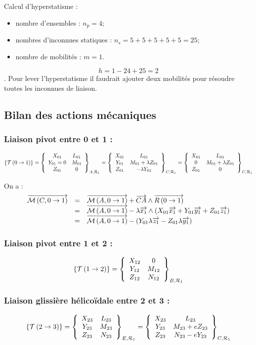 \documentclass[10pt,fleqn]{article} %
\begin{document}
Calcul d'hyperstatisme : 
\begin{itemize}
\item nombre d'ensembles : $n_p=4$;
\item nombres d'inconnues statiques : $n_s = 5+5+5+5+5 = 25$;
\item nombre de mobilités : $m=1$. 
\end{itemize}
$$h = 1-24+25=2$$. Pour lever l'hyperstatisme il faudrait ajouter deux mobilités pour résoudre toutes les inconnues de liaison. 
\subsection{Bilan des actions mécaniques}

\subsubsection*{Liaison pivot entre 0 et 1 :}
$$
\torseurstat{T}{0}{1}
=\torseurcol{X_{01}}{Y_{01}=0}{Z_{01}}{L_{01}}{M_{01}}{0}{A,\mathcal{R}_1}
=\torseurcol{X_{01}}{Y_{01}}{Z_{01}}{L_{01}}{M_{01}+\lambda Z_{01}}{-\lambda Y_{01}}{C,\mathcal{R}_1}
=\torseurcol{X_{01}}{0}{Z_{01}}{L_{01}}{M_{01}+\lambda Z_{01}}{0}{C,\mathcal{R}_1}
$$


On a :
$$
\begin{array}{lcl}
\vectm{C}{0}{1} &=& \vectm{A}{0}{1} + \vect{CA} \wedge \vectf{0}{1} \\
&=& \vectm{A}{0}{1} -\lambda \vect{x_1} \wedge \left( X_{01} \vect{x_1} +Y_{01} \vect{y_1} +Z_{01} \vect{z_1}  \right) \\
&=& \vectm{A}{0}{1} - \left( Y_{01} \lambda \vect{z_1} - Z_{01} \lambda \vect{y_1} \right) \\
\end{array}
$$



\subsubsection*{Liaison pivot entre 1 et 2 :}
$$
\torseurstat{T}{1}{2}=\torseurcol{X_{12}}{Y_{12}}{Z_{12}}{0}{M_{12}}{N_{12}}{B,\mathcal{R}_1}
$$

\subsubsection*{Liaison glissière hélicoïdale entre 2 et 3 :}
$$
\torseurstat{T}{2}{3}
=\torseurcol{X_{23}}{Y_{23}}{Z_{23}}{L_{23}}{M_{23}}{N_{23}}{E,\mathcal{R}_1}
=\torseurcol{X_{23}}{Y_{23}}{Z_{23}}{L_{23}}{M_{23}+eZ_{23}}{N_{23}-eY_{23}}{C,\mathcal{R}_1}
$$
\end{document}
